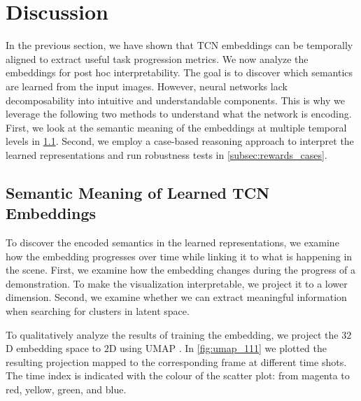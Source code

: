 \documentclass[\home/main.tex]{subfiles}
\begin{document}

\section{Discussion}\label{sec:rewards_discuss}
In the previous section, we have shown that TCN embeddings can be temporally aligned to extract useful task progression metrics. We now analyze the embeddings for post hoc interpretability. The goal is to discover which semantics are learned from the input images. However, neural networks lack decomposability into intuitive and understandable components. This is why we leverage the following two methods to understand what the network is encoding. First, we look at the semantic meaning of the embeddings at multiple temporal levels in \cref{subsec:semantic meaning}. Second, we employ a case-based reasoning approach to interpret the learned representations and run robustness tests in \cref{subsec:rewards_cases}.

\subsection{Semantic Meaning of Learned TCN Embeddings}\label{subsec:semantic meaning}
To discover the encoded semantics in the learned representations, we examine how the embedding progresses over time while linking it to what is happening in the scene. First, we examine how the embedding changes during the progress of a demonstration. To make the visualization interpretable, we project it to a lower dimension. Second, we examine whether we can extract meaningful information when searching for clusters in latent space.

To qualitatively analyze the results of training the embedding, we project the $32$D embedding space to $2$D using UMAP \autocite{UMAP}. In \cref{fig:umap_111} we plotted the resulting projection mapped to the corresponding frame at different time shots. The time index is indicated with the colour of the scatter plot: from magenta to red, yellow, green, and blue.
\end{document}

